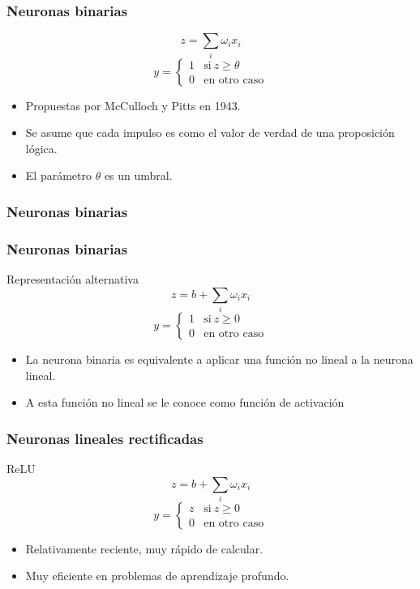 \documentclass{beamer}
\begin{document}
\begin{frame}
  \frametitle{Neuronas binarias}
  \begin{block}{}
      $$ z = \sum_{i} \omega_i x_i $$
      $$ y = \left\{
          \begin{array}{ll}
            1 & \text{si}\ z \ge \theta \\
            0 & \text{en otro caso}
          \end{array} \right. $$
  \end{block}

  \begin{itemize}
  \item Propuestas por McCulloch y Pitts en 1943.
  \item Se asume que cada impulso es como el valor de verdad de una
    proposición lógica.
  \item El parámetro $\theta$ es un umbral.
  \end{itemize}
\end{frame}

\begin{frame}
  \frametitle{Neuronas binarias}

  \frametitle{Neuronas binarias}
  \begin{block}{Representación alternativa}
      $$ z = b + \sum_{i} \omega_i x_i$$
      $$ y = \left\{
          \begin{array}{ll}
            1 & \text{si}\ z \ge 0 \\
            0 & \text{en otro caso}
          \end{array} \right. $$
  \end{block}

  \begin{itemize}
  \item La neurona binaria es equivalente a aplicar una función no
    lineal a la neurona lineal.
  \item A esta función no lineal se le conoce como \alert{función de activación}
  \end{itemize}
\end{frame}

\begin{frame}
 \frametitle{Neuronas lineales rectificadas}
  \begin{block}{ReLU}
      $$ z = b + \sum_{i} \omega_i x_i$$
      $$ y = \left\{
          \begin{array}{ll}
            z & \text{si}\ z \ge 0 \\
            0 & \text{en otro caso}
          \end{array} \right. $$
  \end{block}

  \begin{itemize}
  \item Relativamente reciente, muy rápido de calcular.
  \item Muy eficiente en problemas de aprendizaje profundo.
  \end{itemize}
\end{frame}
\end{document}
